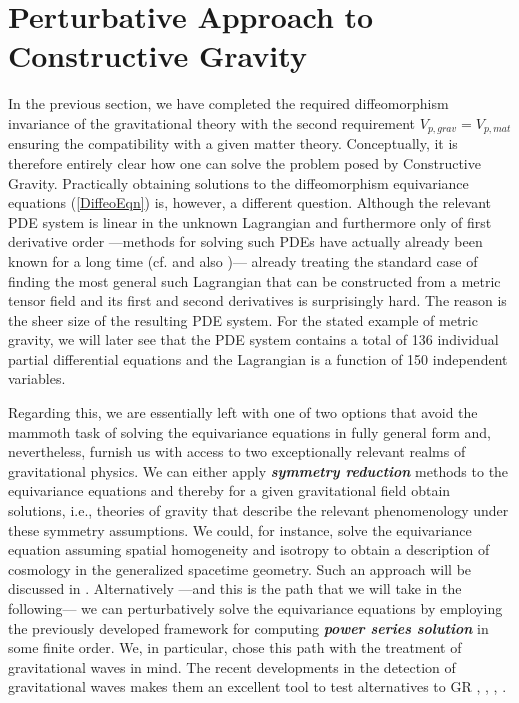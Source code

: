 %
%
%


\section{Perturbative Approach to Constructive Gravity}
In the previous section, we have completed the required diffeomorphism invariance of the gravitational theory with the second requirement $V_{p,grav}=V_{p,mat}$ ensuring the compatibility with a given matter theory. Conceptually, it is therefore entirely clear how one can solve the problem posed by Constructive Gravity. Practically obtaining solutions to the diffeomorphism equivariance equations (\ref{DiffeoEqn}) is, however, a different question. Although the relevant PDE system is linear in the unknown Lagrangian and furthermore only of first derivative order ---methods for solving  such PDEs have actually already been known for a long time (cf. \cite{Hilbert} and also \cite{Han2015})--- already treating the standard case of finding the most general such Lagrangian that can be constructed from a metric tensor field and its first and second derivatives is surprisingly hard. The reason is the sheer size of the resulting PDE system. For the stated example of metric gravity, we will later see that the PDE system contains a total of 136 individual partial differential equations and the Lagrangian is a function of 150 independent variables.  

Regarding this, we are essentially left with one of two options that avoid the mammoth task of solving the equivariance equations in fully general form and, nevertheless, furnish us with access to two exceptionally relevant realms of gravitational physics. We can either apply \textbf{\textit{symmetry reduction}} methods to the equivariance equations and thereby for a given gravitational field obtain solutions, i.e., theories of gravity that describe the relevant phenomenology under these symmetry assumptions. We could, for instance, solve the equivariance equation assuming spatial homogeneity and isotropy to obtain a description of cosmology in the generalized spacetime geometry.
Such an approach will be discussed in \cite{NilsPHD}.
Alternatively ---and this is the path that we will take in the following--- we can perturbatively solve the equivariance equations by employing the previously developed framework for computing \textit{\textbf{power series solution}} in some finite order. We, in particular, chose this path with the treatment of gravitational waves in mind.  The recent developments in the detection of gravitational waves makes them an excellent tool to test alternatives to GR \cite{2010PhRvD..81f4008Y}, \cite{2011PhRvD..83j4022B}, \cite{2017PhRvD..95j4027Z}, \cite{2013LRR....16....9Y}.

